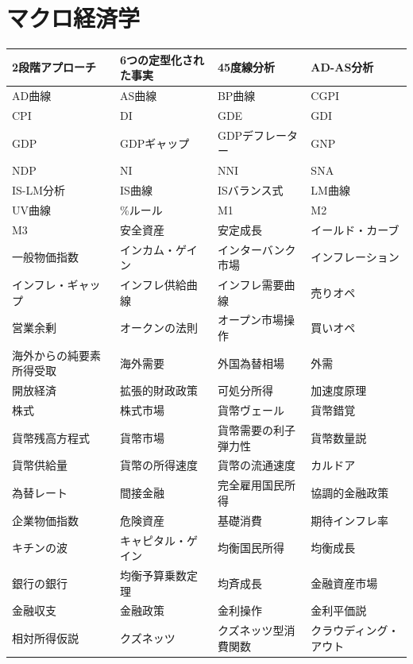 \documentclass[xelatex,a4paper,base=11pt,ja=standard,jafont=noto]{bxjsreport}
\begin{document}
\section{マクロ経済学}
\begin{table}[H]
\centering
\small
\begin{tabular}{|>{\raggedright\arraybackslash}p{3.5cm}|>{\raggedright\arraybackslash}p{3.5cm}|>{\raggedright\arraybackslash}p{3.5cm}|>{\raggedright\arraybackslash}p{3.5cm}|}
\hline
2段階アプローチ & 6つの定型化された事実 & 45度線分析 & AD-AS分析 \\
\hline
AD曲線 & AS曲線 & BP曲線 & CGPI \\
\hline
CPI & DI & GDE & GDI \\
\hline
GDP & GDPギャップ & GDPデフレーター & GNP \\
\hline
NDP & NI & NNI & SNA \\
\hline
IS-LM分析 & IS曲線 & ISバランス式 & LM曲線 \\
\hline
UV曲線 & 2\%ルール & M1 & M2 \\
\hline
M3 & 安全資産 & 安定成長 & イールド・カーブ \\
\hline
一般物価指数 & インカム・ゲイン & インターバンク市場 & インフレーション \\
\hline
インフレ・ギャップ & インフレ供給曲線 & インフレ需要曲線 & 売りオペ \\
\hline
営業余剰 & オークンの法則 & オープン市場操作 & 買いオペ \\
\hline
海外からの純要素所得受取 & 海外需要 & 外国為替相場 & 外需 \\
\hline
開放経済 & 拡張的財政政策 & 可処分所得 & 加速度原理 \\
\hline
株式 & 株式市場 & 貨幣ヴェール & 貨幣錯覚 \\
\hline
貨幣残高方程式 & 貨幣市場 & 貨幣需要の利子弾力性 & 貨幣数量説 \\
\hline
貨幣供給量 & 貨幣の所得速度 & 貨幣の流通速度 & カルドア \\
\hline
為替レート & 間接金融 & 完全雇用国民所得 & 協調的金融政策 \\
\hline
企業物価指数 & 危険資産 & 基礎消費 & 期待インフレ率 \\
\hline
キチンの波 & キャピタル・ゲイン & 均衡国民所得 & 均衡成長 \\
\hline
銀行の銀行 & 均衡予算乗数定理 & 均斉成長 & 金融資産市場 \\
\hline
金融収支 & 金融政策 & 金利操作 & 金利平価説 \\
\hline
相対所得仮説 & クズネッツ & クズネッツ型消費関数 & クラウディング・アウト \\

\end{tabular}
\end{table}
\end{document}

